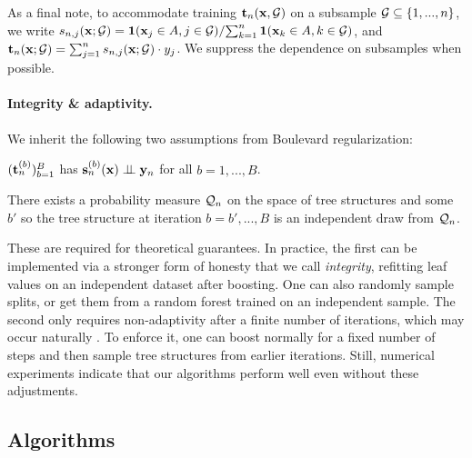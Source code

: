 As a final note, to accommodate training $\mathbf{t}_n(\mathbf{x}, {\mathcal{G}})$ on a subsample ${\mathcal{G}} \subseteq \{1,...,n\}$, we write $s_{n,j}(\mathbf{x}; {\mathcal{G}}) = {\mathbf{1}(\mathbf{x}_j \in A, j \in {\mathcal{G}})}/{\sum_{k=1}^n \mathbf{1}(\mathbf{x}_k \in A, k \in {\mathcal{G}})}$, and $\mathbf{t}_n(\mathbf{x}; {\mathcal{G}}) = \sum_{j=1}^n s_{n,j}(\mathbf{x};{\mathcal{G}}) \cdot y_j$. We suppress the dependence on subsamples when possible.

\vspace{-1ex}
\paragraph{Integrity \& adaptivity.} We inherit the following two assumptions from Boulevard regularization:
\vspace{-2ex}
\begin{aspt}
\label{aspt:svi}
    $(\mathbf{t}_n^{(b)})_{b=1}^B$ has $\mathbf{s}_n^{(b)}(\mathbf{x}) \perp \!\!\! \perp \mathbf{y}_n$ for all $b=1,...,B$.
\end{aspt}
\begin{aspt}
\label{aspt:non-adaptivity}
    There exists a probability measure \({\mathcal{Q}}_n\) on the space of tree structures and some $b'$ so the tree structure at iteration $b=b',...,B$ is an independent draw from \({\mathcal{Q}}_n\).
\end{aspt}
\vspace{-1ex}
These are required for theoretical guarantees. In practice, the first can be implemented via a stronger form of honesty \citep{wager2017estimationinferenceheterogeneoustreatment} that we call \emph{integrity}, refitting leaf values on an independent dataset after boosting. One can also randomly sample splits, or get them from a random forest trained on an independent sample. The second only requires non-adaptivity after a finite number of iterations, which may occur naturally \citep{zhou2022boulevard}. To enforce it, one can boost normally for a fixed number of steps and then sample tree structures from earlier iterations. Still, numerical experiments indicate that our algorithms perform well even without these adjustments.


\vspace{-1ex}
\subsection{Algorithms}
\label{sec:algorithms}
\vspace{-1ex}

